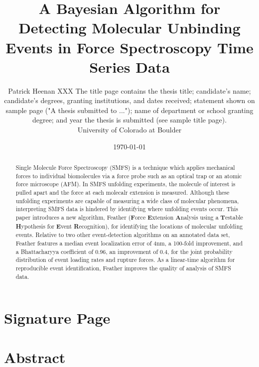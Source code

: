 \documentclass[%
  aip,12pt,tightenlines,
  amsthm,
 amsmath,amssymb
]{article}
\newcommand{\firstp}[0]{}
\newcommand{\name}[0]{Feather}
\newcommand{\acronym}[0]{\textbf{F}orce \textbf{E}xtension \textbf{A}nalysis using a \textbf{T}estable \textbf{H}ypothesis for \textbf{E}vent \textbf{R}ecognition}
\newcommand{\singlemol}[0]{SMFS}
\begin{document}
\singlespacing


\title{A Bayesian Algorithm for Detecting Molecular Unbinding Events in Force Spectroscopy Time Series Data}
\date{\today}
\author{Patrick Heenan XXX The title page contains the thesis title; candidate's name; candidate's degrees, granting institutions, and dates received; statement shown on sample page ("A thesis submitted to ..."); name of department or school granting degree; and year the thesis is submitted (see sample title page).
 \\  University of Colorado at Boulder }

\maketitle
\thispagestyle{empty}


\clearpage

\section{Signature Page}

\clearpage

\section{Abstract}

\begin{abstract}

\firstp Single Molecule Force Spectroscopy (\singlemol{}) is a technique which applies mechanical forces to individual biomolecules via a force probe such as an optical trap or an atomic force microscope (AFM). In \singlemol{} unfolding experiments, the molecule of interest is pulled apart and the force at each molecalr extension is measured. Although these unfolding experiments are capable of measuring a wide class of molecular phenomena, interpreting \singlemol{} data is hindered by identifying where unfolding events occur. This paper introduces a new algorithm, \name{} (\acronym), for identifying the locations of molecular unfolding events. Relative to two other event-detection algorithms on an annotated data set, \name{} features a median event localization error of 4nm, a 100-fold improvement, and a Bhattacharyya coefficient of 0.96, an improvement of 0.4, for the joint probability distribution of event loading rates and rupture forces. As a linear-time algorithm for reproducible event identification, \name{} improves the quality of analysis of \singlemol{} data.
\end{abstract}
\end{document}
